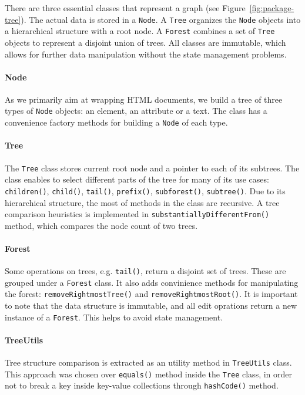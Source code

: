 There are three essential classes that represent a graph (see Figure~\ref{fig:package-tree}). The actual data is stored in a \texttt{Node}. A \texttt{Tree} organizes the \texttt{Node} objects into a hierarchical structure with a root node. A \texttt{Forest} combines a set of \texttt{Tree} objects to represent a disjoint union of trees. All classes are immutable, which allows for further data manipulation without the state management problems.


\paragraph{Node} As we primarily aim at wrapping HTML documents, we build a tree of three types of \texttt{Node} objects: an element, an attribute or a text. The class has a convenience factory methods for building a \texttt{Node} of each type.

\paragraph{Tree} The \texttt{Tree} class stores current root node and a pointer to each of its subtrees. The class enables to select different parts of the tree for many of its use cases: \texttt{children()}, \texttt{child()}, \texttt{tail()}, \texttt{prefix()}, \texttt{subforest()}, \texttt{subtree()}. Due to its hierarchical structure, the most of methods in the class are recursive. A tree comparison heuristics is implemented in \texttt{substantiallyDifferentFrom()} method, which compares the node count of two trees.

\paragraph{Forest} Some operations on trees, e.g. \texttt{tail()}, return a disjoint set of trees. These are grouped under a \texttt{Forest} class. It also adds convinience methods for manipulating the forest: \texttt{removeRightmostTree()} and \texttt{removeRightmostRoot()}. It is important to note that the data structure is immutable, and all edit oprations return a new instance of a \texttt{Forest}. This helps to avoid state management.

\paragraph{TreeUtils} Tree structure comparison is extracted as an utility method in \texttt{TreeUtils} class. This approach was chosen over \texttt{equals()} method inside the \texttt{Tree} class, in order not to break a key inside key-value collections through \texttt{hashCode()} method.

